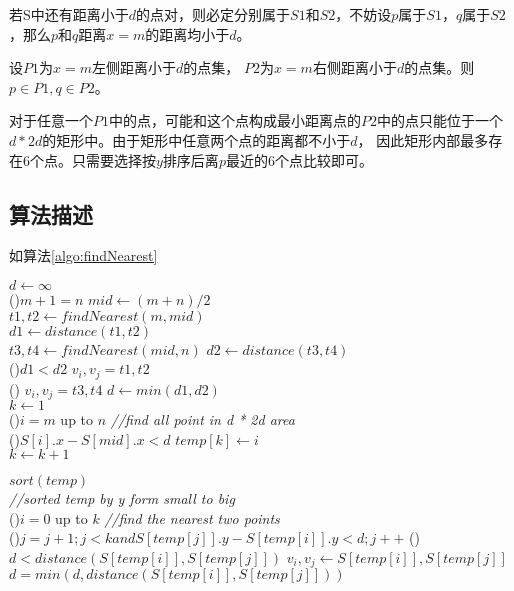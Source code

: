 若S中还有距离小于$d$的点对，则必定分别属于$S1$和$S2$，不妨设$p$属于$S1$，$q$属于$S2$，那么$p$和$q$距离$x=m$的距离均小于$d$。

设$P1$为$x=m$左侧距离小于$d$的点集， $P2$为$x=m$右侧距离小于$d$的点集。则 $p \in P1, q \in P2$。

对于任意一个$P1$中的点，可能和这个点构成最小距离点的$P2$中的点只能位于一个 $d * 2d$的矩形中。由于矩形中任意两个点的距离都不小于$d$，
因此矩形内部最多存在6个点。只需要选择按$y$排序后离$p$最近的6个点比较即可。


\subsection*{算法描述}

如算法\ref{algo:findNearest}

\begin{algorithm}[H]
    \caption{$findNearest(S[1..n])$}\label{algo:findNearest}
    $d \leftarrow \infty$\\

    \If(){$m+1=n$}{
    }
    $mid \leftarrow (m+n)/2 $\\
    $t1, t2 \leftarrow findNearest(m,mid)$\\
    $d1 \leftarrow distance(t1,t2)$\\
    $t3, t4 \leftarrow findNearest(mid, n)$
    $d2 \leftarrow distance(t3, t4)$\\
    \If(){$d1 < d2$}{
        $v_i, v_j = t1, t2$\\
    }\Else(){
        $v_i, v_j = t3, t4$
    }
    $d \leftarrow min(d1, d2)$\\
    $k \leftarrow 1$ \\
    \For(){$i = m$ up to $n$}{ \emph{//find all point in d * 2d area} \\
        \If(){$S[i].x-S[mid].x < d$}{
            $temp[k] \leftarrow i$\\
            $k \leftarrow k+1$
        }
    }

    $sort(temp)$ \\
    \emph{//sorted temp by y form small to big} \\

    \For(){$i= 0$ up to $k$}{ \emph{//find the nearest two points}\\
        \For(){$j=j+1; j<k and S[temp[j]].y - S[temp[i]].y < d; j++$}{
            \If(){$d < distance(S[temp[i]], S[temp[j]])$}{
                $v_i, v_j \leftarrow S[temp[i]], S[temp[j]] $
            }
            $d=min(d, distance(S[temp[i]], S[temp[j]]))$
        }
    }

\end{algorithm}


